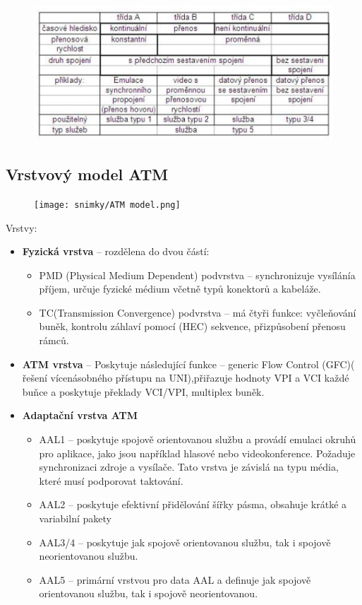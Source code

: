 \begin{figure}[h]
    \centering
    \includegraphics[scale=0.6]{snimky/sluzby.png}
\end{figure}
\newpage

\subsection{Vrstvový model ATM}
\begin{figure} [h]
    \centering
    \texttt{[image: snimky/ATM model.png]}
    \label{fig:vrstvovy-model-atm}
\end{figure}
Vrstvy:
\begin{itemize}
    \item \textbf{Fyzická vrstva} -- rozdělena do dvou částí:
          \begin{itemize}
              \item PMD (Physical Medium Dependent) podvrstva -- synchronizuje vysílánía příjem, určuje fyzické médium včetně typů konektorů a kabeláže.
              \item TC(Transmission Convergence) podvrstva -- má čtyři funkce: vyčleňování buněk, kontrolu záhlaví pomocí (HEC) sekvence, přizpůsobení přenosu rámců.
          \end{itemize}
    \item \textbf{ATM vrstva} -- Poskytuje následující funkce -- generic Flow Control (GFC)( řešení vícenásobného přístupu na UNI),přiřazuje hodnoty VPI a VCI každé buňce a poskytuje překlady VCI/VPI, multiplex buněk.
    \item \textbf{Adaptační vrstva ATM}
          \begin{itemize}
              \item AAL1 -- poskytuje spojově orientovanou službu a provádí emulaci okruhů pro aplikace, jako jsou například hlasové nebo videokonference. Požaduje synchronizaci zdroje a vysílače. Tato vrstva je závislá na typu média, které musí podporovat taktování.
              \item AAL2 -- poskytuje efektivní přidělování šířky pásma, obsahuje krátké a variabilní pakety
              \item AAL3/4 -- poskytuje jak spojově orientovanou službu, tak i spojově neorientovanou službu.
              \item AAL5 -- primární vrstvou pro data AAL a definuje jak spojově orientovanou službu, tak i spojově neorientovanou.
          \end{itemize}
\end{itemize}


